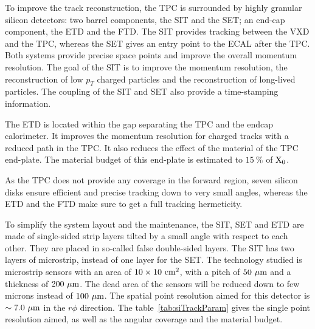       To improve the track reconstruction, the \gls{TPC} is surrounded by highly granular silicon detectors: two barrel components, the \gls{SIT} and the \gls{SET}; an end-cap component, the \gls{ETD} and the \gls{FTD}.
      The \gls{SIT} provides tracking between the \gls{VXD} and the \gls{TPC}, whereas the \gls{SET} gives an entry point to the \gls{ECAL} after the \gls{TPC}.
      Both systems provide precise space points and improve the overall momentum resolution.
      The goal of the \gls{SIT} is to improve the momentum resolution, the reconstruction of low $p_{T}$ charged particles and the reconstruction of long-lived particles.
      The coupling of the \gls{SIT} and \gls{SET} also provide a time-stamping information.

      The \gls{ETD} is located within the gap separating the \gls{TPC} and the endcap calorimeter. 
      It improves the momentum resolution for charged tracks with a reduced path in the \gls{TPC}.
      It also reduces the effect of the material of the \gls{TPC} end-plate. 
      The material budget of this end-plate is estimated to $15~\%$ of $\rm{X_0}$.

      As the \gls{TPC} does not provide any coverage in the forward region, seven silicon disks ensure efficient and precise tracking down to very small angles, whereas the \gls{ETD} and the \gls{FTD} make sure to get a full tracking hermeticity.

      To simplify the system layout and the maintenance, the \gls{SIT}, \gls{SET} and \gls{ETD} are made of single-sided strip layers tilted by a small angle with respect to each other. 
      They are placed in so-called false double-sided layers.
      The \gls{SIT} has two layers of microstrip, instead of one layer for the \gls{SET}. 
      The technology studied is microstrip sensors with an area of $10 \times 10~\rm{cm}^2$, with a pitch of $50~\rm{\mu m}$ and a thickness of $200~\rm{\mu m}$.
      The dead area of the sensors will be reduced down to few microns instead of $100~\rm{\mu m}$.
      The spatial point resolution aimed for this detector is $\sim 7.0~\rm{\mu m}$ in the $r\phi$ direction.
      The table~\ref{tab:siTrackParam} gives the single point resolution aimed, as well as the angular coverage and the material budget.

